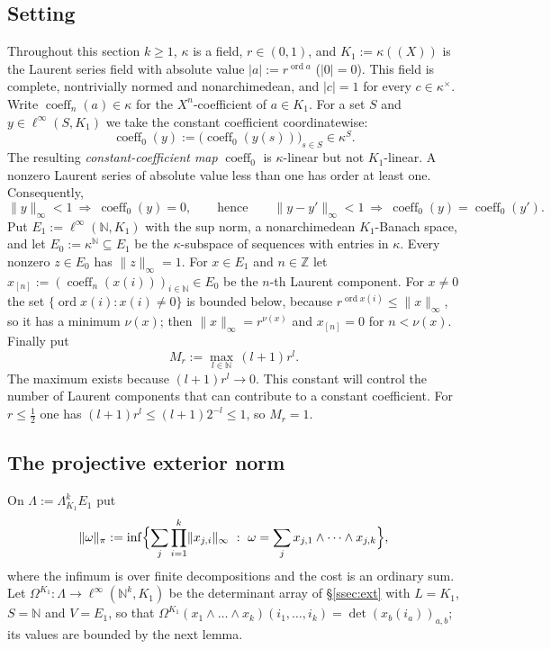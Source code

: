 \documentclass[11pt]{amsart}
\theoremstyle{definition}
\theoremstyle{remark}
\numberwithin{equation}{section}
\newcommand{\N}{\mathbb N}
\newcommand{\Z}{\mathbb Z}
\newcommand{\linf}{\ell^\infty}
\newcommand{\abs}[1]{\lvert #1\rvert}
\newcommand{\norm}[1]{\lVert #1\rVert}
\newcommand{\coeff}{\operatorname{coeff}}
\newcommand{\ord}{\operatorname{ord}}
\begin{document}
\subsection{Setting}\label{ssec:laurentsetting}
Throughout this section $k\ge1$, $\kappa$ is a field, $r\in(0,1)$, and $K_1:=\kappa((X))$ is the Laurent series field with
absolute value $\abs a:=r^{\ord a}$ ($\abs0=0$). This field is complete, nontrivially normed and nonarchimedean, and
$\abs c=1$ for every $c\in\kappa^\times$. Write $\coeff_n(a)\in\kappa$ for the $X^n$\nobreakdash-coefficient of $a\in K_1$.
For a set $S$ and $y\in\linf(S,K_1)$ we take the constant coefficient coordinatewise:
\[
\coeff_0(y):=\bigl(\coeff_0(y(s))\bigr)_{s\in S}\in\kappa^S.
\]
The resulting \emph{constant-coefficient map} $\coeff_0$ is $\kappa$\nobreakdash-linear but not $K_1$\nobreakdash-linear.
A nonzero Laurent series of absolute value less than one has order at least one. Consequently,
\begin{equation}\label{eq:small}
\norm y_\infty<1\ \Longrightarrow\ \coeff_0(y)=0,\qquad\text{hence}\qquad \norm{y-y'}_\infty<1\ \Longrightarrow\ \coeff_0(y)=\coeff_0(y').
\end{equation}
Put $E_1:=\linf(\N,K_1)$ with the sup norm, a nonarchimedean $K_1$\nobreakdash-Banach space, and let $E_0:=\kappa^\N\subseteq E_1$ be
the $\kappa$\nobreakdash-subspace of sequences with entries in $\kappa$. Every nonzero $z\in E_0$ has $\norm z_\infty=1$. For
$x\in E_1$ and $n\in\Z$ let $x_{[n]}:=(\coeff_n(x(i)))_{i\in\N}\in E_0$ be the $n$\nobreakdash-th Laurent component. For $x\ne0$
the set $\{\ord x(i):x(i)\ne0\}$ is bounded below, because $r^{\ord x(i)}\le\norm x_\infty$, so it has a minimum
$\nu(x)$; then $\norm x_\infty=r^{\nu(x)}$ and $x_{[n]}=0$ for $n<\nu(x)$. Finally put
\[
M_r:=\max_{l\in\N}\,(l+1)r^l .
\]
The maximum exists because $(l+1)r^l\to0$. This constant will control the number of Laurent components that can
contribute to a constant coefficient. For $r\le\frac12$ one has $(l+1)r^l\le(l+1)2^{-l}\le1$, so $M_r=1$.

\subsection{The projective exterior norm}\label{ssec:projnorm}
On $\Lambda:=\Lambda^k_{K_1}E_1$ put
\[
\norm\omega_\pi:=\inf\Bigl\{\sum_j\prod_{i=1}^k\norm{x_{j,i}}_\infty\ :\ \omega=\sum_jx_{j,1}\wedge\dots\wedge x_{j,k}\Bigr\},
\]
where the infimum is over finite decompositions and the cost is an ordinary sum. Let $\Omega^{K_1}\colon\Lambda\to\linf(\N^k,K_1)$ be the determinant
array of \S\ref{ssec:ext} with $L=K_1$, $S=\N$ and $V=E_1$, so that
$\Omega^{K_1}(x_1\wedge\dots\wedge x_k)(i_1,\dots,i_k)=\det(x_b(i_a))_{a,b}$; its values are bounded by the next lemma.
\end{document}
